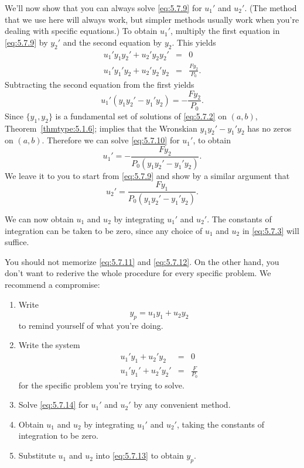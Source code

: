 \documentclass{ximera}
\begin{document}
We'll now show that you can always solve \eqref{eq:5.7.9} for $u_1'$
and $u_2'$. (The method that we use here will always work, but simpler
methods usually work when you're dealing with specific equations.) To
obtain $u_1'$, multiply the first equation in \eqref{eq:5.7.9} by $y_2'$
and the second equation by $y_2$. This yields
\begin{eqnarray*}
u_1'y_1y_2'+u_2'y_2y_2'&=& 0  \\
u_1'y_1'y_2+u_2'y_2'y_2 &=& \frac{Fy_2}{P_0}.
\end{eqnarray*}
Subtracting the second equation from the first yields
\begin{equation} \label{eq:5.7.10}
u_1'(y_1y_2'-y_1'y_2)=-\frac{Fy_2}{P_0}.
\end{equation}
Since $\{y_1,y_2\}$  is a fundamental set of solutions of \eqref{eq:5.7.2}
on $(a,b)$, Theorem~\ref{thmtype:5.1.6}; implies that the Wronskian
 $y_1y_2'-y_1'y_2$  has no zeros on $(a,b)$.  Therefore we can solve
\eqref{eq:5.7.10} for $u_1'$, to obtain
\begin{equation} \label{eq:5.7.11}
u_1'=-\frac{Fy_2}{P_0(y_1y_2'-y_1'y_2)}.
\end{equation}
We leave it to you to start from \eqref{eq:5.7.9} and show by a similar
argument that
\begin{equation} \label{eq:5.7.12}
u_2'=\frac{Fy_1}{P_0(y_1y_2'-y_1'y_2)}.
\end{equation}
 
We can now obtain $u_1$ and $u_2$ by integrating $u_1'$ and $u_2'$.
The constants of integration can be taken to be zero, since any choice
of $u_1$ and $u_2$ in \eqref{eq:5.7.3} will suffice.
 
You should not memorize \eqref{eq:5.7.11} and \eqref{eq:5.7.12}. On the
other hand, you don't want to rederive the whole procedure for every
specific problem. We recommend a compromise:
\begin{enumerate}
\item\label{item:compromiseA} %
Write
\begin{equation} \label{eq:5.7.13}
y_p=u_1y_1+u_2y_2
\end{equation}
to remind yourself of what you're doing.
\item \label{item:compromiseB}%
Write the system
\begin{equation} \label{eq:5.7.14}
\begin{array}{rcl}
u_1'y_1+u_2'y_2 &=& 0  \\
u_1'y_1'+u_2'y_2' &=& \frac{F}{P_0}
\end{array}
\end{equation}
for the specific problem  you're trying to solve.
\item\label{item:compromiseC} %
Solve \eqref{eq:5.7.14} for $u_1'$ and $u_2'$ by any convenient method.
\item \label{item:compromiseD}%
Obtain $u_1$ and $u_2$ by integrating $u_1'$ and $u_2'$,
taking the constants of integration to be zero.
\item \label{item:compromiseE}%
Substitute $u_1$ and $u_2$ into \eqref{eq:5.7.13}  to obtain $y_p$.
\end{enumerate}
 
\end{document}
